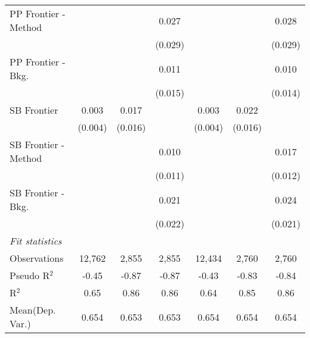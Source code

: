 \begin{tabular}{lcccccc}
   PP Frontier - Method &                &         & 0.027   &                &         & 0.028\\   
                        &                &         & (0.029) &                &         & (0.029)\\   
   PP Frontier - Bkg.   &                &         & 0.011   &                &         & 0.010\\   
                        &                &         & (0.015) &                &         & (0.014)\\   
   SB Frontier          & 0.003          & 0.017   &         & 0.003          & 0.022   &   \\   
                        & (0.004)        & (0.016) &         & (0.004)        & (0.016) &   \\   
   SB Frontier - Method &                &         & 0.010   &                &         & 0.017\\   
                        &                &         & (0.011) &                &         & (0.012)\\   
   SB Frontier - Bkg.   &                &         & 0.021   &                &         & 0.024\\   
                        &                &         & (0.022) &                &         & (0.021)\\   
   \midrule
   \emph{Fit statistics}\\
   Observations         & 12,762         & 2,855   & 2,855   & 12,434         & 2,760   & 2,760\\  
   Pseudo R$^2$         & -0.45          & -0.87   & -0.87   & -0.43          & -0.83   & -0.84\\  
   R$^2$                & 0.65           & 0.86    & 0.86    & 0.64           & 0.85    & 0.86\\  
Mean(Dep. Var.) & 0.654 & 0.653 & 0.653 & 0.654 & 0.654 & 0.654 \\
   

\end{tabular}
